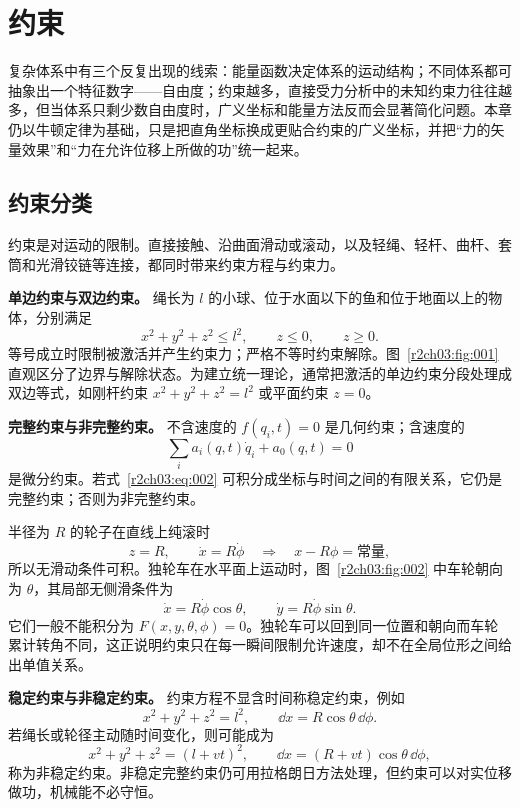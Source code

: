 \section{约束}
\label{r2ch03:sec:constraint}

复杂体系中有三个反复出现的线索：能量函数决定体系的运动结构；不同体系都可抽象出一个特征数字——自由度；约束越多，直接受力分析中的未知约束力往往越多，但当体系只剩少数自由度时，广义坐标和能量方法反而会显著简化问题。本章仍以牛顿定律为基础，只是把直角坐标换成更贴合约束的广义坐标，并把“力的矢量效果”和“力在允许位移上所做的功”统一起来。

\subsection{约束分类}

约束是对运动的限制。直接接触、沿曲面滑动或滚动，以及轻绳、轻杆、曲杆、套筒和光滑铰链等连接，都同时带来约束方程与约束力。

\textbf{单边约束与双边约束。} 绳长为 $l$ 的小球、位于水面以下的鱼和位于地面以上的物体，分别满足
\begin{equation}
 x^2+y^2+z^2\le l^2,\qquad z\le0,\qquad z\ge0 .
 \label{r2ch03:eq:001}
\end{equation}
等号成立时限制被激活并产生约束力；严格不等时约束解除。图~\ref{r2ch03:fig:001} 直观区分了边界与解除状态。为建立统一理论，通常把激活的单边约束分段处理成双边等式，如刚杆约束 $x^2+y^2+z^2=l^2$ 或平面约束 $z=0$。
\figConstraintRelease

\textbf{完整约束与非完整约束。} 不含速度的 $f(q_i,t)=0$ 是几何约束；含速度的
\begin{equation}
 \sum_i a_i(q,t)\dot q_i+a_0(q,t)=0
 \label{r2ch03:eq:002}
\end{equation}
是微分约束。若式~\eqref{r2ch03:eq:002} 可积分成坐标与时间之间的有限关系，它仍是完整约束；否则为非完整约束。

半径为 $R$ 的轮子在直线上纯滚时
\[
 z=R,\qquad \dot x=R\dot\phi
 \quad\Longrightarrow\quad x-R\phi=\text{常量},
\]
所以无滑动条件可积。独轮车在水平面上运动时，图~\ref{r2ch03:fig:002} 中车轮朝向为 $\theta$，其局部无侧滑条件为
\begin{equation}
 \dot x=R\dot\phi\cos\theta,\qquad
 \dot y=R\dot\phi\sin\theta .
 \label{r2ch03:eq:003}
\end{equation}
它们一般不能积分为 $F(x,y,\theta,\phi)=0$。独轮车可以回到同一位置和朝向而车轮累计转角不同，这正说明约束只在每一瞬间限制允许速度，却不在全局位形之间给出单值关系。
\figUnicycleConstraint

\textbf{稳定约束与非稳定约束。} 约束方程不显含时间称稳定约束，例如
\[
 x^2+y^2+z^2=l^2,\qquad \dd x=R\cos\theta\,\dd\phi .
\]
若绳长或轮径主动随时间变化，则可能成为
\[
 x^2+y^2+z^2=(l+vt)^2,\qquad
 \dd x=(R+vt)\cos\theta\,\dd\phi ,
\]
称为非稳定约束。非稳定完整约束仍可用拉格朗日方法处理，但约束可以对实位移做功，机械能不必守恒。

